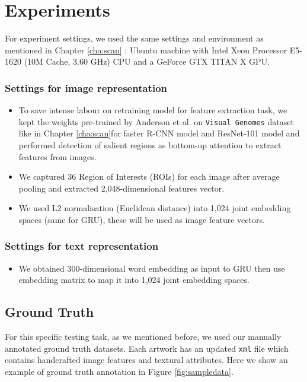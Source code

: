 \section{Experiments}

For experiment settings, we used the same settings and environment as mentioned in Chapter \ref{cha:scan} : Ubuntu machine with Intel Xeon Processor E5-1620 (10M Cache, 3.60 GHz) CPU and a GeForce GTX TITAN X GPU. 

\subsubsection{Settings for image representation}

\begin{itemize}
    \item To save intense labour on retraining model for feature extraction task, we kept the weights pre-trained by Anderson et al. on \verb|Visual Genomes| dataset like in Chapter \ref{cha:scan}for faster R-CNN model and ResNet-101 model and performed detection of salient regions as bottom-up attention to extract features from images. 
    \item We captured 36 Region of Interests (ROIs) for each image after average pooling and extracted 2,048-dimensional features vector.
    \item We used L2 normalisation (Euclidean distance) into 1,024 joint embedding spaces (same for GRU), these will be used as image feature vectors.
\end{itemize}

\subsubsection{Settings for text representation}

\begin{itemize}
    \item We obtained 300-dimensional word embedding as input to GRU then use embedding matrix to map it into 1,024 joint embedding spaces.
\end{itemize}

\subsection{Ground Truth}

For this specific testing task, as we mentioned before, we used our manually annotated ground truth datasets. Each artwork has an updated \verb|xml| file which contains handcrafted image features and textural attributes. Here we show an example of ground truth annotation in Figure \ref{fig:sampledata}.

